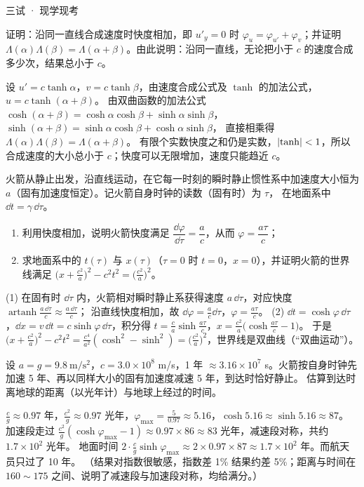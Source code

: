 \documentclass[cjk=noto, seal=first]{mojing-exam}
\begin{document}
\begin{paper}[time={建议 2.5 小时，含阅读（训练设置）}, full=100]{三试 · 现学现考}
\begin{questions}
\question[10] 证明：沿同一直线合成速度时快度相加，即 $u'_y=0$ 时 $\varphi_u=\varphi_{u'}+\varphi_v$；并证明 $\Lambda(\alpha)\Lambda(\beta)=\Lambda(\alpha+\beta)$。由此说明：沿同一直线，无论把小于 $c$ 的速度合成多少次，结果总小于 $c$。
\answerspace{2.5cm}
\begin{solution}
设 $u'=c\tanh\alpha$，$v=c\tanh\beta$，由速度合成公式及 $\tanh$ 的加法公式，$u=c\tanh(\alpha+\beta)$。
由双曲函数的加法公式 $\cosh(\alpha+\beta)=\cosh\alpha\cosh\beta+\sinh\alpha\sinh\beta$，$\sinh(\alpha+\beta)=\sinh\alpha\cosh\beta+\cosh\alpha\sinh\beta$，
直接相乘得 $\Lambda(\alpha)\Lambda(\beta)=\Lambda(\alpha+\beta)$。
有限个实数快度之和仍是实数，$\lvert\tanh\rvert<1$，所以合成速度的大小总小于 $c$；快度可以无限增加，速度只能趋近 $c$。
\end{solution}

\question[12] 火箭从静止出发，沿直线运动，在它每一时刻的瞬时静止惯性系中加速度大小恒为 $a$（固有加速度恒定）。记火箭自身时钟的读数（固有时）为 $\tau$，
在地面系中 $\dd t=\gamma\,\dd\tau$。
\begin{enumerate}
  \item 利用快度相加，说明火箭快度满足 $\dfrac{\dd\varphi}{\dd\tau}=\dfrac ac$，从而 $\varphi=\dfrac{a\tau}{c}$；
  \item 求地面系中的 $t(\tau)$ 与 $x(\tau)$（$\tau=0$ 时 $t=0$，$x=0$），并证明火箭的世界线满足 $\bigl(x+\frac{c^2}a\bigr)^2-c^2t^2=\bigl(\frac{c^2}a\bigr)^2$。
\end{enumerate}
\answerspace{3cm}
\begin{solution}
(1) 在固有时 $\dd\tau$ 内，火箭相对瞬时静止系获得速度 $a\,\dd\tau$，对应快度 $\operatorname{artanh}\frac{a\,\dd\tau}c\approx\frac{a\,\dd\tau}c$；
沿直线快度相加，故 $\dd\varphi=\frac ac\dd\tau$，$\varphi=\frac{a\tau}c$。
(2) $\dd t=\cosh\varphi\,\dd\tau$，$\dd x=v\,\dd t=c\sinh\varphi\,\dd\tau$，积分得
$t=\frac ca\sinh\frac{a\tau}c$，$x=\frac{c^2}a\bigl(\cosh\frac{a\tau}c-1\bigr)$。
于是 $\bigl(x+\frac{c^2}a\bigr)^2-c^2t^2=\frac{c^4}{a^2}(\cosh^2-\sinh^2)=\bigl(\frac{c^2}a\bigr)^2$，世界线是双曲线（“双曲运动”）。
\end{solution}

\question[10] 设 $a=g=9.8\ \mathrm{m/s^2}$，$c=3.0\times10^8$ m/s，1 年 $\approx3.16\times10^7$ s。火箭按自身时钟先加速 5 年、再以同样大小的固有加速度减速 5 年，到达时恰好静止。
估算到达时离地球的距离（以光年计）与地球上经过的时间。
\answerspace{2.5cm}
\begin{solution}
$\frac cg\approx0.97$ 年，$\frac{c^2}g\approx0.97$ 光年，$\varphi_{\max}=\frac{5}{0.97}\approx5.16$，$\cosh5.16\approx\sinh5.16\approx87$。
加速段走过 $\frac{c^2}g(\cosh\varphi_{\max}-1)\approx0.97\times86\approx83$ 光年，减速段对称，共约 $1.7\times10^2$ 光年。
地面时间 $2\cdot\frac cg\sinh\varphi_{\max}\approx2\times0.97\times87\approx1.7\times10^2$ 年。而航天员只过了 10 年。
（结果对指数很敏感，指数差 1\% 结果约差 5\%；距离与时间在 $160\sim175$ 之间、说明了减速段与加速段对称，均给满分。）
\end{solution}


\end{questions}
\end{paper}
\end{document}
